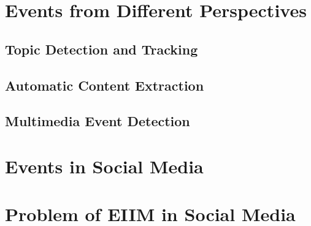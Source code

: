 \section{Events from Different Perspectives}

\subsection{Topic Detection and Tracking}

\subsection{Automatic Content Extraction}

\subsection{Multimedia Event Detection}

\section{Events in Social Media}

\section{Problem of EIIM in Social Media}